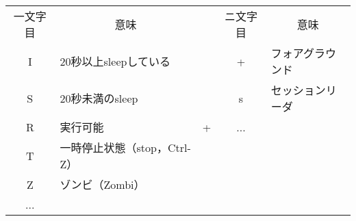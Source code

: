 \documentclass[border=1mm]{standalone}
\begin{document}
{\ttfamily
\begin{tabular}{ | c | l| c | c | l |}
\cline{1-2}\cline{4-5}
\multicolumn{1}{|c}{一文字目} &
\multicolumn{1}{|c|}{意味}    &
&
\multicolumn{1}{|c}{ニ文字目} &
\multicolumn{1}{|c|}{意味} \\
\cline{1-2}\cline{4-5}
I   & 20秒以上sleepしている        &     &  +   & フォアグラウンド \\
S   & 20秒未満のsleep              &     &  s   & セッションリーダ \\
R   & 実行可能                     &  +  &  ... &                  \\  
T   & 一時停止状態（stop，Ctrl-Z） &     &      &                  \\
Z   & ゾンビ（Zombi）              &     &      &                  \\
... &                              &     &      &                  \\
\cline{1-2}\cline{4-5}
\end{tabular}}
\end{document}

